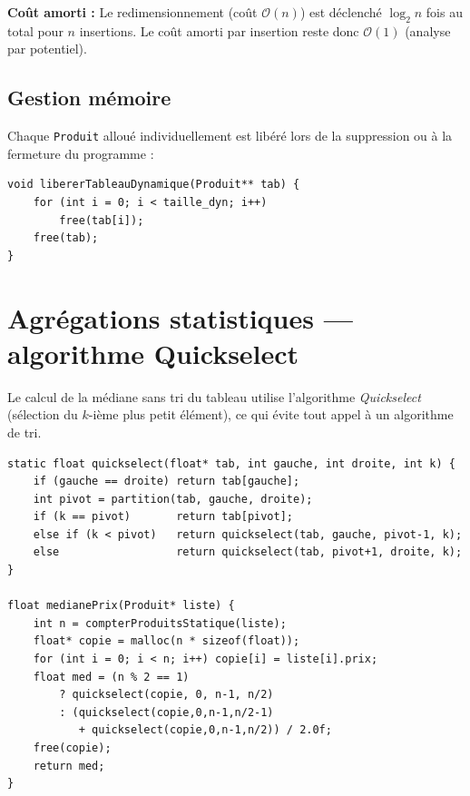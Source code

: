 \documentclass[12pt,a4paper]{report}
\begin{document}
\begin{boiteInfo}
\textbf{Coût amorti :} Le redimensionnement (coût $\mathcal{O}(n)$) est déclenché $\log_2 n$ fois au total pour $n$ insertions. Le coût amorti par insertion reste donc $\mathcal{O}(1)$ (analyse par potentiel).
\end{boiteInfo}

\subsection{Gestion mémoire}

Chaque \texttt{Produit} alloué individuellement est libéré lors de la suppression ou à la fermeture du programme :

\begin{lstlisting}[caption={Libération du tableau dynamique}]
void libererTableauDynamique(Produit** tab) {
    for (int i = 0; i < taille_dyn; i++)
        free(tab[i]);
    free(tab);
}
\end{lstlisting}

\section{Agrégations statistiques — algorithme Quickselect}

Le calcul de la médiane sans tri du tableau utilise l'algorithme \emph{Quickselect} (sélection du $k$-ième plus petit élément), ce qui évite tout appel à un algorithme de tri.

\begin{lstlisting}[caption={Quickselect pour la médiane en O(n) moyen}]
static float quickselect(float* tab, int gauche, int droite, int k) {
    if (gauche == droite) return tab[gauche];
    int pivot = partition(tab, gauche, droite);
    if (k == pivot)       return tab[pivot];
    else if (k < pivot)   return quickselect(tab, gauche, pivot-1, k);
    else                  return quickselect(tab, pivot+1, droite, k);
}

float medianePrix(Produit* liste) {
    int n = compterProduitsStatique(liste);
    float* copie = malloc(n * sizeof(float));
    for (int i = 0; i < n; i++) copie[i] = liste[i].prix;
    float med = (n % 2 == 1)
        ? quickselect(copie, 0, n-1, n/2)
        : (quickselect(copie,0,n-1,n/2-1)
           + quickselect(copie,0,n-1,n/2)) / 2.0f;
    free(copie);
    return med;
}
\end{lstlisting}

\end{document}
